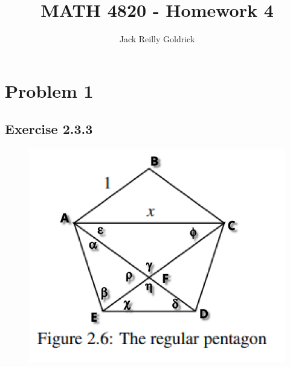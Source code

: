 \documentclass[]{report}
\title{MATH 4820 - Homework 4}
\author{Jack Reilly Goldrick}
\begin{document}
\maketitle


\section{Problem 1}

\subsection{Exercise 2.3.3}

\begin{figure}[H]
	\centering
	\includegraphics[width=0.7\linewidth]{pics/p1}
\end{figure}
\end{document}
